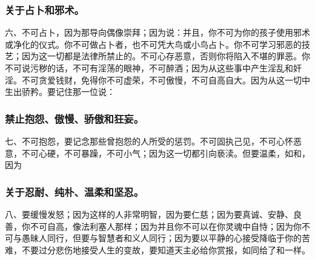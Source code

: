
\subsubsection{关于占卜和邪术。}

六、不可占卜，因为那导向偶像崇拜；因为说：并且，你不可为你的孩子使用邪术或净化的仪式。你不可做占卜者，也不可凭大鸟或小鸟占卜。你不可学习邪恶的技艺；因为这一切都是法律所禁止的。不可心存恶意，否则你将陷入不堪的罪恶。你不可说污秽的话，不可有淫荡的眼神，不可醉酒；因为从这些事中产生淫乱和奸淫。不可贪爱钱财，免得你不可虚荣，不可傲慢，不可自高自大。因为从这一切中生出骄矜。要记住那一位说：\par


\subsubsection{禁止抱怨、傲慢、骄傲和狂妄。}

七、不可抱怨，要记念那些曾抱怨的人所受的惩罚。不可固执己见，不可心怀恶意，不可心硬，不可暴躁，不可小气；因为这一切都引向亵渎。但要温柔，如和，因为\par


\subsubsection{关于忍耐、纯朴、温柔和坚忍。}

八、要缓慢发怒；因为这样的人非常明智，因为要仁慈；因为要真诚、安静、良善，你不可自高，像法利塞人那样；因为并且你不可以在你灵魂中自恃；因为你不可与愚昧人同行，但要与智慧者和义人同行；因为要以平静的心接受降临于你的苦难，不要过分悲伤地接受人生的变故，要知道天主必给你赏报，如同给了和一样。\par

